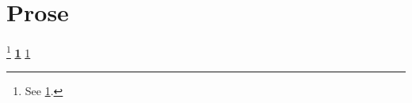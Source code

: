 \documentclass{article}
\begin{document}
\section{Prose \cite{in-title}}\label{sec:a}
\caption{A caption citing \cite{in-caption} \label{fig:in-caption}}
\footnote{See \ref{sec:a}.} \emph{\cite{in-emph}} \textbf{\ref{sec:a}}
\texttt{\ref{sec:a}}  
\href{http://x}{\cite{in-href}} \title{\cite{in-title-command}}
\end{document}
